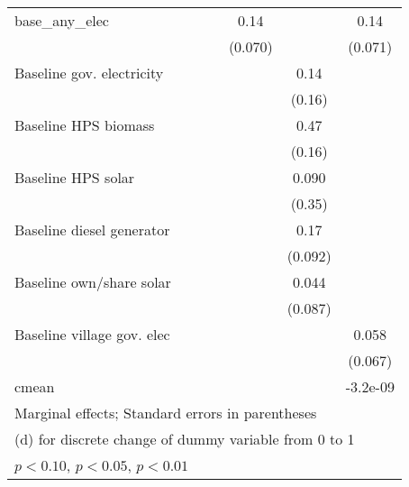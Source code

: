 \begin{table}[htbp]
\begin{tabular*}{1\hsize}{@{\hskip\tabcolsep\extracolsep\fill}l*{6}{c}}
base\_any\_elec   &                  &                  &                  &     0.14\sym{*}  &                  &     0.14\sym{*}  \\
                &                  &                  &                  &  (0.070)         &                  &  (0.071)         \\
Baseline gov. electricity&                  &                  &                  &                  &     0.14         &                  \\
                &                  &                  &                  &                  &   (0.16)         &                  \\
Baseline HPS biomass&                  &                  &                  &                  &     0.47\sym{***}&                  \\
                &                  &                  &                  &                  &   (0.16)         &                  \\
Baseline HPS solar&                  &                  &                  &                  &    0.090         &                  \\
                &                  &                  &                  &                  &   (0.35)         &                  \\
Baseline diesel generator&                  &                  &                  &                  &     0.17\sym{*}  &                  \\
                &                  &                  &                  &                  &  (0.092)         &                  \\
Baseline own/share solar&                  &                  &                  &                  &    0.044         &                  \\
                &                  &                  &                  &                  &  (0.087)         &                  \\
Baseline village gov. elec&                  &                  &                  &                  &                  &    0.058         \\
                &                  &                  &                  &                  &                  &  (0.067)         \\
\midrule
cmean           &                  &                  &                  &                  &                  & -3.2e-09         \\
\bottomrule
\multicolumn{7}{l}{\footnotesize Marginal effects; Standard errors in parentheses}\\
\multicolumn{7}{l}{\footnotesize  (d) for discrete change of dummy variable from 0 to 1}\\
\multicolumn{7}{l}{\footnotesize \sym{*} \(p<0.10\), \sym{**} \(p<0.05\), \sym{***} \(p<0.01\)}\\
\end{tabular*}
\end{table}
